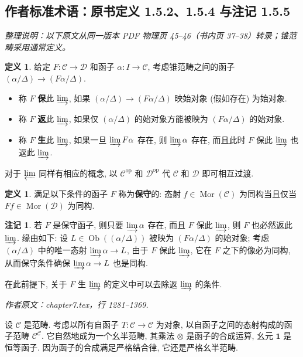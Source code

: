 \documentclass[11pt]{article}
\newcommand{\Obj}{\operatorname{Ob}}
\newcommand{\Mor}{\operatorname{Mor}}
\newcommand{\opp}{\mathrm{op}}
\newcommand{\munit}{\mathbf{1}}
\newcommand{\CorpusNumber}{0}
\theoremstyle{definition}
\newtheorem{definition}[theorem]{定义}
\newtheorem{remark}[theorem]{注记}
\begin{document}
\subsection*{作者标准术语：原书定义 1.5.2、1.5.4 与注记 1.5.5}
\noindent\textit{整理说明：以下原文从同一版本 PDF 物理页 45--46（书内页 37--38）转录；锥范畴采用通常定义。}
\par\medskip
\def\CorpusNumber{1.5.2}\begin{definition}\label{def:create-limit}
给定 $F: \mathcal{C}\to\mathcal{D}$ 和函子 $\alpha:I\to\mathcal{C}$, 考虑锥范畴之间的函子 $(\alpha/\Delta)\to(F\alpha/\Delta)$.
\begin{itemize}
\item 称 $F$ \textbf{保}此 $\varinjlim$, 如果 $(\alpha/\Delta)\to(F\alpha/\Delta)$ 映始对象 (假如存在) 为始对象.
\item 称 $F$ \textbf{返}此 $\varinjlim$, 如果仅 $(\alpha/\Delta)$ 的始对象方能被映为 $(F\alpha/\Delta)$ 的始对象.
\item 称 $F$ \textbf{生}此 $\varinjlim$, 如果一旦 $\varinjlim F\alpha$ 存在, 则 $\varinjlim\alpha$ 存在, 而且此时 $F$ 保此 $\varinjlim$ 也返此 $\varinjlim$.
\end{itemize}
对于 $\varprojlim$ 同样有相应的概念, 以 $\mathcal{C}^{\opp}$ 和 $\mathcal{D}^{\opp}$ 代 $\mathcal{C}$ 和 $\mathcal{D}$ 即可相互过渡.
\end{definition}
\def\CorpusNumber{1.5.4}\begin{definition}\label{def:conservative}
满足以下条件的函子 $F$ 称为\textbf{保守}的: 态射 $f\in\Mor(\mathcal{C})$ 为同构当且仅当 $Ff\in\Mor(\mathcal{D})$ 为同构.
\end{definition}
\def\CorpusNumber{1.5.5}\begin{remark}\label{rem:conservative-reflect}
若 $F$ 是保守函子, 则只要 $\varinjlim\alpha$ 存在, 而且 $F$ 保此 $\varinjlim$, 则 $F$ 也必然返此 $\varinjlim$. 缘由如下: 设 $L\in\Obj((\alpha/\Delta))$ 被映为 $(F\alpha/\Delta)$ 的始对象; 考虑 $(\alpha/\Delta)$ 中的唯一态射 $\varinjlim\alpha\to L$, 由于 $F$ 保此 $\varinjlim$, 它在 $F$ 之下的像必为同构, 从而保守条件确保 $\varinjlim\alpha\to L$ 也是同构.

在此前提下, 关于 $F$ 生 $\varinjlim$ 的定义中可以去除返 $\varinjlim$ 的条件.
\end{remark}
\par\medskip\noindent\textit{作者原文：chapter7.tex，行 1281--1369.}\par
设 $\mathcal{C}$ 是范畴. 考虑以所有自函子 $T: \mathcal{C} \to \mathcal{C}$ 为对象, 以自函子之间的态射构成的函子范畴 $\mathcal{C}^{\mathcal{C}}$. 它自然地成为一个幺半范畴, 其乘法 $\otimes$ 是函子的合成运算, 幺元 $\munit$ 是恒等函子. 因为函子的合成满足严格结合律, 它还是严格幺半范畴.
\end{document}
